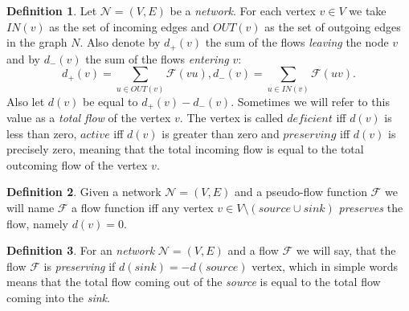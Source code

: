 \documentclass[12pt]{article}
\renewcommand{\cal}[1]{\mathcal{#1}}
\theoremstyle{definition}
\newtheorem{definition}{Definition}
\numberwithin{remark}{section}
\numberwithin{theorem}{section}
\numberwithin{prop}{section}
\numberwithin{equation}{section}
\numberwithin{lemma}{section}
\numberwithin{prop_under_lemma}{lemma}
\begin{document}
    \begin{definition}
        Let $\cal{N} = (V, E)$ be a \textit{network}. For each vertex $v \in V$
        we take $IN(v)$ as the set of incoming edges and $OUT(v)$ as the set of outgoing edges in the
        graph $N$.
        Also denote by $d_{+}(v)$ the sum of the flows \textit{leaving} the node $v$ and by
        $d_{-}(v)$ the sum of the flows \textit{entering} $v$:
        \begin{equation*}
            d_{+}(v) = \sum_{u \in OUT(v)} \cal{F}(vu),
            d_{-}(v) = \sum_{u \in IN(v)} \cal{F}(uv).
        \end{equation*}
        Also let $d(v)$ be equal to $d_{+}(v) - d_{-}(v)$. Sometimes we will refer to this value as
        a \textit{total flow} of the vertex $v$.
        The vertex is called $deficient$ iff $d(v)$ is less than zero,
        $active$ iff $d(v)$ is greater than zero and
        $preserving$ iff $d(v)$ is precisely zero, meaning that the total incoming flow
        is equal to the total outcoming flow of the vertex $v$.
    \end{definition}
    \begin{definition}
        Given a network $\cal{N} = (V, E)$ and a pseudo-flow function $\cal{F}$ we will name $\cal{F}$ a flow function iff 
        any vertex $v\in V\setminus (\mathit{source}\cup\mathit{sink})$ \textit{preserves} the flow, namely
        $d(v) = 0$.
    \end{definition}
    \begin{definition}
        For an \textit{network} $\mathcal{N} =  (V, E)$ and a flow $\cal{F}$ we will say,
        that the flow $\cal{F}$ is \textit{preserving} if $d(\mathit{sink}) = -d(\mathit{source})$ vertex, which
        in simple words means that the total flow coming out of the \textit{source} is equal to the total flow
        coming into the \textit{sink}.
    \end{definition}
    
\end{document}
